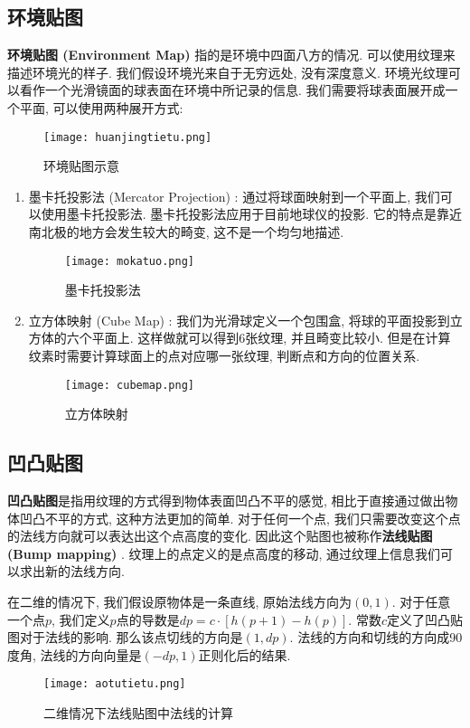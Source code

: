 \documentclass[openany]{progbookcn}
\begin{document}
\subsection{环境贴图}
\textbf{环境贴图 (Environment Map) }指的是环境中四面八方的情况. 可以使用纹理来描述环境光的样子. 我们假设环境光来自于无穷远处, 没有深度意义. 环境光纹理可以看作一个光滑镜面的球表面在环境中所记录的信息. 我们需要将球表面展开成一个平面, 可以使用两种展开方式: 
\begin{figure}[H]
	\centering
	\texttt{[image: huanjingtietu.png]}
	\caption{环境贴图示意}
	\label{fig:huanjingtietu}
\end{figure}
\begin{enumerate}
	\item 墨卡托投影法 (Mercator Projection) : 通过将球面映射到一个平面上, 我们可以使用墨卡托投影法. 墨卡托投影法应用于目前地球仪的投影. 它的特点是靠近南北极的地方会发生较大的畸变, 这不是一个均匀地描述. 
	\begin{figure}[H]
		\centering
		\texttt{[image: mokatuo.png]}
		\caption{墨卡托投影法}
		\label{fig:mokatuo}
	\end{figure}
	\item 立方体映射 (Cube Map) : 我们为光滑球定义一个包围盒, 将球的平面投影到立方体的六个平面上. 这样做就可以得到6张纹理, 并且畸变比较小. 但是在计算纹素时需要计算球面上的点对应哪一张纹理, 判断点和方向的位置关系. 
	\begin{figure}[H]
	\centering
	\texttt{[image: cubemap.png]}
	\caption{立方体映射}
	\label{fig:cubemap}
	\end{figure}
\end{enumerate}

\subsection{凹凸贴图}
\textbf{凹凸贴图}是指用纹理的方式得到物体表面凹凸不平的感觉, 相比于直接通过做出物体凹凸不平的方式, 这种方法更加的简单. 对于任何一个点, 我们只需要改变这个点的法线方向就可以表达出这个点高度的变化. 因此这个贴图也被称作\textbf{法线贴图 (Bump mapping) }. 纹理上的点定义的是点高度的移动, 通过纹理上信息我们可以求出新的法线方向. 

在二维的情况下, 我们假设原物体是一条直线, 原始法线方向为$(0,1)$. 对于任意一个点$p$, 我们定义$p$点的导数是$dp=c\cdot [h(p+1)-h(p)]$. 常数$c$定义了凹凸贴图对于法线的影响. 那么该点切线的方向是$(1, dp)$. 法线的方向和切线的方向成90度角, 法线的方向向量是$(-dp, 1)$正则化后的结果. 
\begin{figure}[H]
	\centering
	\texttt{[image: aotutietu.png]}
	\caption{二维情况下法线贴图中法线的计算}
	\label{fig:aotu}
\end{figure}
\end{document}
